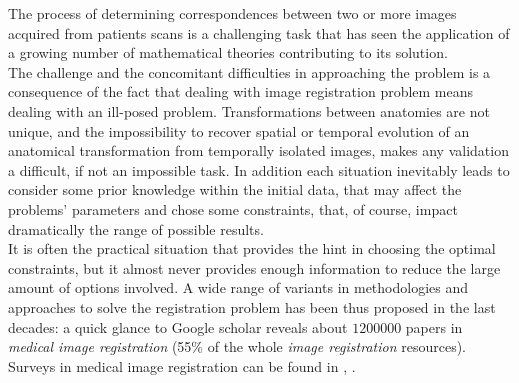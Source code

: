 The process of determining correspondences between two or more images acquired from patients scans is a challenging task that has seen the application of a growing number of mathematical theories contributing to its solution.\\
The challenge and the concomitant difficulties in approaching the problem is a consequence of the fact that dealing with image registration problem means dealing with an ill-posed problem. Transformations between anatomies are not unique, and the impossibility to recover spatial or temporal evolution of an anatomical transformation from temporally isolated images, makes any validation a difficult, if not an impossible task. 
In addition each situation inevitably leads to consider some prior knowledge within the initial data, that may affect the problems' parameters and chose some constraints, that, of course, impact dramatically the range of possible results. \\
It is often the practical situation that provides the hint in choosing the optimal constraints, but it almost never provides enough information to reduce the large amount of options involved. A wide range of variants in methodologies and approaches to solve the registration problem has been thus proposed in the last decades: a quick glance to Google scholar reveals about $1200000$ papers in \emph{medical image registration} (55\% of the whole \emph{image registration} resources). Surveys in medical image registration can be found in \cite{Sotiras:survey:13}, \cite{zitova2003image}.

